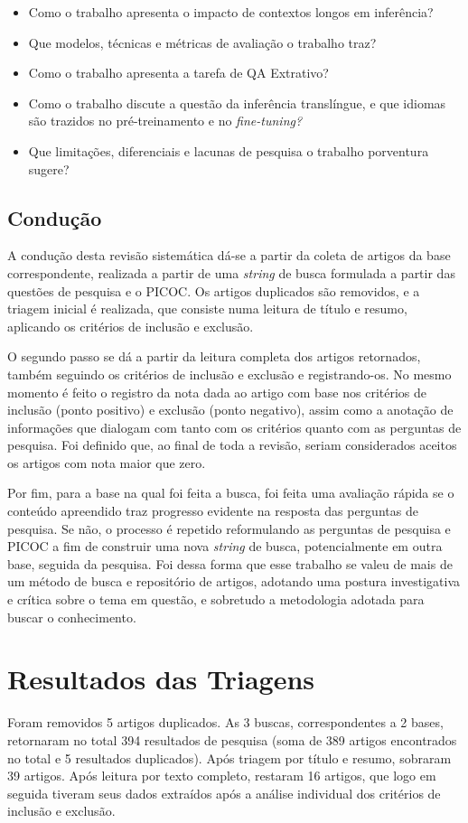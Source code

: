 \documentclass[12pt,a4paper]{article}
\begin{document}
\begin{itemize}
    \item Como o trabalho apresenta o impacto de contextos longos em inferência?
    \item Que modelos, técnicas e métricas de avaliação o trabalho traz?
    \item Como o trabalho apresenta a tarefa de QA Extrativo?
    \item Como o trabalho discute a questão da inferência translíngue, e que idiomas são trazidos no pré-treinamento e no \textit{fine-tuning?}
    \item Que limitações, diferenciais e lacunas de pesquisa o trabalho porventura sugere?
\end{itemize}

\subsection{Condução}
A condução desta revisão sistemática dá-se a partir da coleta de artigos da base correspondente, realizada a partir de uma \textit{string} de busca formulada a partir das questões de pesquisa e o PICOC. Os artigos duplicados são removidos, e a triagem inicial é realizada, que consiste numa leitura de título e resumo, aplicando os critérios de inclusão e exclusão.

O segundo passo se dá a partir da leitura completa dos artigos retornados, também seguindo os critérios de inclusão e exclusão e registrando-os. No mesmo momento é feito o registro da nota dada ao artigo com base nos critérios de inclusão (ponto positivo) e exclusão (ponto negativo), assim como a anotação de informações que dialogam com tanto com os critérios quanto com as perguntas de pesquisa. Foi definido que, ao final de toda a revisão, seriam considerados aceitos os artigos com nota maior que zero.

Por fim, para a base na qual foi feita a busca, foi feita uma avaliação rápida se o conteúdo apreendido traz progresso evidente na resposta das perguntas de pesquisa. Se não, o processo é repetido reformulando as perguntas de pesquisa e PICOC a fim de construir uma nova \textit{string} de busca, potencialmente em outra base, seguida da pesquisa. Foi dessa forma que esse trabalho se valeu de mais de um método de busca e repositório de artigos, adotando uma postura investigativa e crítica sobre o tema em questão, e sobretudo a metodologia adotada para buscar o conhecimento.

\section{Resultados das Triagens}
Foram removidos 5 artigos duplicados. As 3 buscas, correspondentes a 2 bases, retornaram no total 394 resultados de pesquisa (soma de 389 artigos encontrados no total e 5 resultados duplicados). Após triagem por título e resumo, sobraram 39 artigos. Após leitura por texto completo, restaram 16 artigos, que logo em seguida tiveram seus dados extraídos após a análise individual dos critérios de inclusão e exclusão. 
\end{document}
